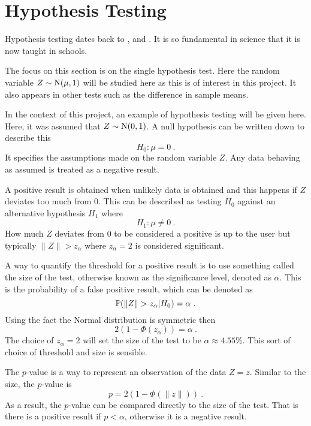 \section{Hypothesis Testing}

Hypothesis testing dates back to \cite{pearson1900on}, \cite{neyman1933on} and \cite{fisher1970statistical}. It is so fundamental in science that it is now taught in schools.

The focus on this section is on the single hypothesis test. Here the random variable $Z\sim\operatorname{N}(\mu,1)$ will be studied here as this is of interest in this project. It also appears in other tests such as the difference in sample means.

In the context of this project, an example of hypothesis testing will be given here. Here, it was assumed that $Z\sim\operatorname{N}(0,1)$. A null hypothesis can be written down to describe this
\begin{equation}
    H_0:\mu=0 \ .
\end{equation}
It specifies the assumptions made on the random variable $Z$. Any data behaving as assumed is treated as a negative result.

A positive result is obtained when unlikely data is obtained and this happens if $Z$ deviates too much from 0. This can be described as testing $H_0$ against an alternative hypothesis $H_1$ where
\begin{equation}
    H_1:\mu\neq0 \ .
\end{equation}
How much $Z$ deviates from 0 to be considered a positive is up to the user but typically $\|Z\|>z_\alpha$ where $z_\alpha =2$ is considered significant.

A way to quantify the threshold for a positive result is to use something called the size of the test, otherwise known as the significance level, denoted as $\alpha$. This is the probability of a false positive result, which can be denoted as
\begin{equation}
    \prob(\|Z\|>z_\alpha|H_0) = \alpha \ .
\end{equation}
Using the fact the Normal distribution is symmetric then
\begin{equation}
    2(1 - \Phi(z_\alpha)) = \alpha \ .
    \label{eq:inference_single_alpha}
\end{equation}
The choice of $z_\alpha=2$ will set the size of the test to be $\alpha\approx 4.55\%$. This sort of choice of threshold and size is sensible.

The $p$-value is a way to represent an observation of the data $Z=z$. Similar to the size, the $p$-value is
\begin{equation}
    p=2(1-\Phi(\|z\|)) \ .
\end{equation}
As a result, the $p$-value can be compared directly to the size of the test. That is there is a positive result if $p<\alpha$, otherwise it is a negative result.

